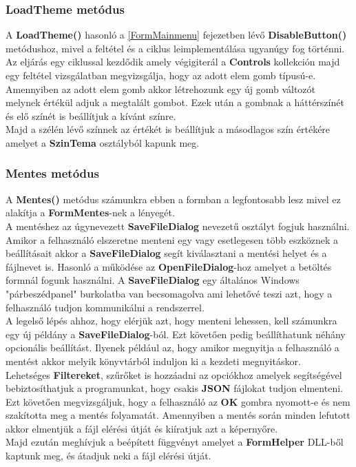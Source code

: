 \documentclass[tocnopagenum]{thesis-ekf}
\theoremstyle{definition}
\theoremstyle{remark}
\begin{document}
	\subsubsection{LoadTheme metódus}
	A \textbf{LoadTheme()} hasonló a \ref{FormMainmenu} fejezetben lévő \textbf{DisableButton()} metódushoz, mivel a feltétel és a ciklus leimplementálása ugyanúgy fog történni. 
	\\
	Az eljárás egy ciklussal kezdődik amely végigiterál a \textbf{Controls} kollekción majd egy feltétel vizsgálatban megvizsgálja, hogy az adott elem gomb típusú-e. Amennyiben az adott elem gomb akkor létrehozunk egy új gomb változót melynek értékül adjuk a megtalált gombot. Ezek után a gombnak a háttérszínét és elő színét is beállítjuk a kívánt színre. 
	\\
	Majd a szélén lévő színnek az értékét is beállítjuk a másodlagos szín értékére amelyet a \textbf{SzinTema} osztályból kapunk meg.
	\subsubsection{Mentes metódus}
	A \textbf{Mentes()} metódus számunkra ebben a formban a legfontosabb lesz mivel ez alakítja a \textbf{FormMentes}-nek a lényegét. 
	\\
	A mentéshez az úgynevezett \textbf{SaveFileDialog} nevezetű osztályt fogjuk használni. 
	\\
	Amikor a felhasználó elszeretne menteni egy vagy esetlegesen több eszköznek a beállításait akkor a \textbf{SaveFileDialog} segít kiválasztani a mentési helyet és a fájlnevet is. Hasonló a működése az \textbf{OpenFileDialog}-hoz amelyet a betöltés formnál fogunk használni. A \textbf{SaveFileDialog} egy általános Windows "párbeszédpanel" burkolatba van becsomagolva ami lehetővé teszi azt, hogy a felhasználó tudjon kommunikálni a rendszerrel.
	\\
	A legelső lépés ahhoz, hogy elérjük azt, hogy menteni lehessen, kell számunkra egy új példány a \textbf{SaveFileDialog}-ból. Ezt követően pedig beállíthatunk néhány opcionális beállítást. Ilyenek például az, hogy amikor megnyitja a felhasználó a mentést akkor melyik könyvtárból induljon ki a kezdeti megnyitáskor. 
	\\
	Lehetséges \textbf{Filtereket}, szűrőket is hozzáadni az opciókhoz amelyek segítségével bebiztosíthatjuk a programunkat, hogy csakis \textbf{JSON} fájlokat tudjon elmenteni.
	\\
	Ezt követően megvizsgáljuk, hogy a felhasználó az \textbf{OK} gombra nyomott-e és nem szakította meg a mentés folyamatát. Amennyiben a mentés során minden lefutott akkor elmentjük a fájl elérési útját és kiíratjuk azt a képernyőre.
	\\
	Majd ezután meghívjuk a beépített függvényt amelyet a \textbf{FormHelper} DLL-ből kaptunk meg, és átadjuk neki a fájl elérési útját.
\end{document}
